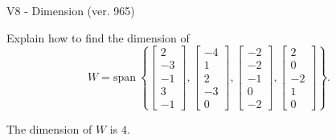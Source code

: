 \begin{exercise}
  \begin{exerciseTitle}V8 - Dimension (ver. 965)\end{exerciseTitle}
  \begin{exerciseStatement}
    Explain how to find the dimension of 
\[W=\mathrm{span}\ \left\{\left[\begin{array}{r}
2 \\
-3 \\
-1 \\
3 \\
-1
\end{array}\right] , \left[\begin{array}{r}
-4 \\
1 \\
2 \\
-3 \\
0
\end{array}\right] , \left[\begin{array}{r}
-2 \\
-2 \\
-1 \\
0 \\
-2
\end{array}\right] , \left[\begin{array}{r}
2 \\
0 \\
-2 \\
1 \\
0
\end{array}\right]\right\}.\]



  \end{exerciseStatement}
  \begin{exerciseAnswer}
   The dimension of \(W\) is  \(4\).
  


  \end{exerciseAnswer}
\end{exercise}